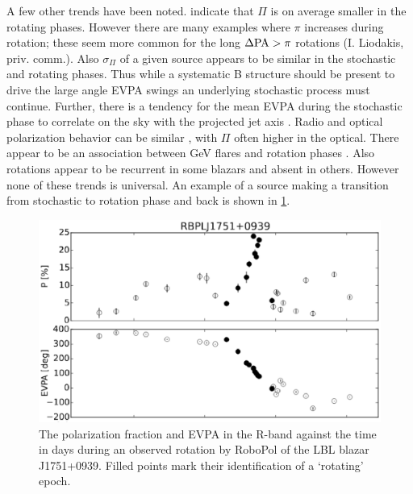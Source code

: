 A few other trends have been noted. \citet{blinov_robopol:_2016} indicate that $\Pi$ is on average smaller in the rotating phases. However there are many examples where $\pi$ increases during rotation; these seem more common for the long $\Delta {\rm PA} > \pi$ rotations (I. Liodakis, priv. comm.). Also $\sigma_\Pi$ of a given source appears to be similar in the stochastic and rotating phases. Thus while a systematic B structure should be present to drive the large angle EVPA swings an underlying stochastic process must continue. Further, there is a tendency for the mean EVPA during the stochastic phase to correlate on the sky with the projected jet axis \citep{jorstad_multifrequency_2006}. Radio and optical polarization behavior can be similar \citep{darcangelo_synchronous_2009}, with $\Pi$ often higher in the optical. There appear to be an association between GeV flares and rotation phases \citep{blinov_robopol:_2018}. Also rotations appear to be recurrent in some blazars and absent in others. However none of these trends is universal. An example of a source making a transition from stochastic to rotation phase and back is shown in \cref{fig:f1}.
\\  
\begin{figure}[t]
\label{fig:f1}
\includegraphics[width=0.8\linewidth]{figures/f1.eps}
\centering
\caption{The polarization fraction and EVPA in the R-band against the time in days during an observed rotation by RoboPol \citep{blinov_robopol:_2016} of the LBL blazar J1751+0939. Filled points mark their identification of a `rotating' epoch.}
\end{figure}


